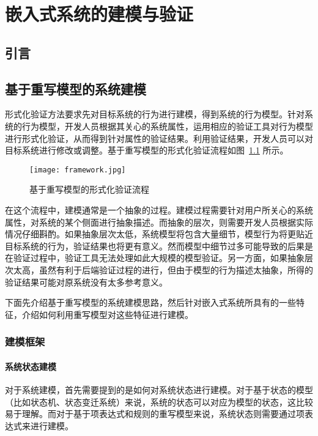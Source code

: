 \chapter{嵌入式系统的建模与验证}

\section{引言}

\section{基于重写模型的系统建模}
\label{s:modeling}

形式化验证方法要求先对目标系统的行为进行建模，得到系统的行为模型。针对系统的行为模型，开发人员根据其关心的系统属性，运用相应的验证工具对行为模型进行形式化验证，从而得到针对属性的验证结果。利用验证结果，开发人员可以对目标系统进行修改或调整。基于重写模型的形式化验证流程如图~\ref{f:framework} 所示。

\begin{figure}[ht]
\centering
\texttt{[image: framework.jpg]}
\caption{基于重写模型的形式化验证流程}
\label{f:framework}
\end{figure}

在这个流程中，建模通常是一个抽象的过程。建模过程需要针对用户所关心的系统属性，对系统的某个侧面进行抽象描述。而抽象的层次，则需要开发人员根据实际情况仔细斟酌。如果抽象层次太低，系统模型将包含大量细节，模型行为将更贴近目标系统的行为，验证结果也将更有意义。然而模型中细节过多可能导致的后果是在验证过程中，验证工具无法处理如此大规模的模型验证。另一方面，如果抽象层次太高，虽然有利于后端验证过程的进行，但由于模型的行为描述太抽象，所得的验证结果可能对原系统没有太多参考意义。

下面先介绍基于重写模型的系统建模思路，然后针对嵌入式系统所具有的一些特征，介绍如何利用重写模型对这些特征进行建模。

\subsection{建模框架}

\subsubsection{系统状态建模}
对于系统建模，首先需要提到的是如何对系统状态进行建模。对于基于状态的模型（比如状态机、状态变迁系统）来说，系统的状态可以对应为模型的状态，这比较易于理解。而对于基于项表达式和规则的重写模型来说，系统状态则需要通过项表达式来进行建模。


